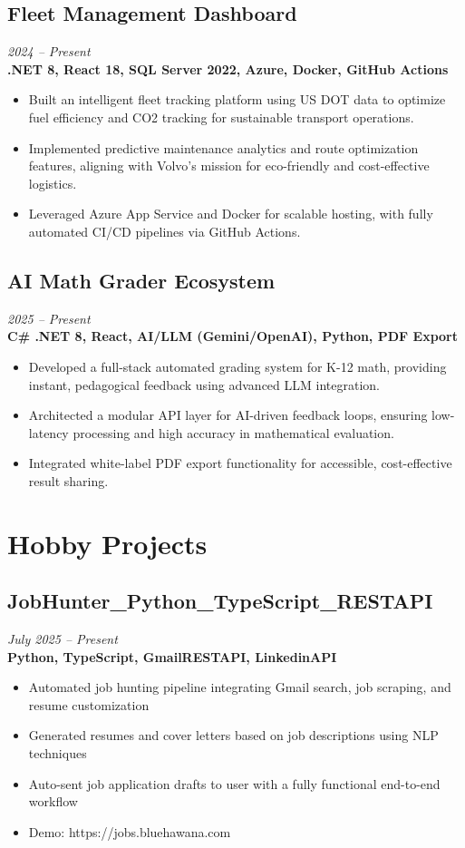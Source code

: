 \documentclass[11pt,a4paper]{article}
\begin{document}
\subsection{Fleet Management Dashboard}
\textit{2024 -- Present} \\
\textbf{.NET 8, React 18, SQL Server 2022, Azure, Docker, GitHub Actions}
\begin{itemize}
\item Built an intelligent fleet tracking platform using US DOT data to optimize fuel efficiency and CO2 tracking for sustainable transport operations.
\item Implemented predictive maintenance analytics and route optimization features, aligning with Volvo's mission for eco-friendly and cost-effective logistics.
\item Leveraged Azure App Service and Docker for scalable hosting, with fully automated CI/CD pipelines via GitHub Actions.
\end{itemize}

\subsection{AI Math Grader Ecosystem}
\textit{2025 -- Present} \\
\textbf{C\# .NET 8, React, AI/LLM (Gemini/OpenAI), Python, PDF Export}
\begin{itemize}
\item Developed a full-stack automated grading system for K-12 math, providing instant, pedagogical feedback using advanced LLM integration.
\item Architected a modular API layer for AI-driven feedback loops, ensuring low-latency processing and high accuracy in mathematical evaluation.
\item Integrated white-label PDF export functionality for accessible, cost-effective result sharing.
\end{itemize}

\section*{Hobby Projects}
\subsection{JobHunter\_Python\_TypeScript\_RESTAPI}
\textit{July 2025 -- Present} \\
\textbf{Python, TypeScript, GmailRESTAPI, LinkedinAPI}
\begin{itemize}
\item Automated job hunting pipeline integrating Gmail search, job scraping, and resume customization
\item Generated resumes and cover letters based on job descriptions using NLP techniques
\item Auto-sent job application drafts to user with a fully functional end-to-end workflow
\item Demo: https://jobs.bluehawana.com
\end{itemize}
\end{document}
